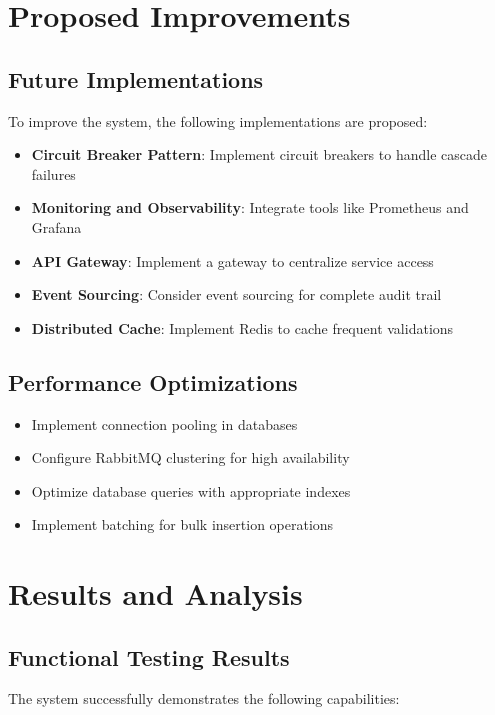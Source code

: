 \documentclass[10pt,a4paper]{article}
\theoremstyle{definition}
\theoremstyle{remark}
\begin{document}
\section{Proposed Improvements}

\subsection{Future Implementations}
To improve the system, the following implementations are proposed:

\begin{itemize}
    \item \textbf{Circuit Breaker Pattern}: Implement circuit breakers to handle cascade failures
    \item \textbf{Monitoring and Observability}: Integrate tools like Prometheus and Grafana
    \item \textbf{API Gateway}: Implement a gateway to centralize service access
    \item \textbf{Event Sourcing}: Consider event sourcing for complete audit trail
    \item \textbf{Distributed Cache}: Implement Redis to cache frequent validations
\end{itemize}

\subsection{Performance Optimizations}
\begin{itemize}
    \item Implement connection pooling in databases
    \item Configure RabbitMQ clustering for high availability
    \item Optimize database queries with appropriate indexes
    \item Implement batching for bulk insertion operations
\end{itemize}

\section{Results and Analysis}

\subsection{Functional Testing Results}
The system successfully demonstrates the following capabilities:
\end{document}

